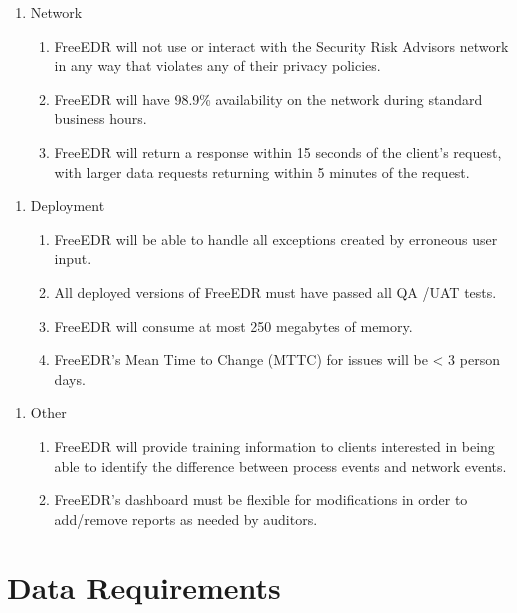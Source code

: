\documentclass{scrreprt}
\begin{document}
\begin{enumerate}[label*=N\arabic*.]
    \item Network
    \begin{enumerate}[label*=\arabic*.]
\item FreeEDR will not use or interact with the Security Risk Advisors network in any way that violates any of their privacy policies. 
\item FreeEDR will have 98.9\% availability on the network during standard business hours.
\item FreeEDR will return a response within 15 seconds of the client’s request, with larger data requests returning within 5 minutes of the request.

    \end{enumerate}
\end{enumerate}

\begin{enumerate}[label*=N\arabic*.]
    \item Deployment
    \begin{enumerate}[label*=\arabic*.]
\item FreeEDR will be able to handle all exceptions created by erroneous user input. 
\item All deployed versions of FreeEDR must have passed all QA /UAT tests.
\item FreeEDR will consume at most 250 megabytes of memory.
\item FreeEDR’s Mean Time to Change (MTTC) for issues will be < 3 person days. 

    \end{enumerate}
\end{enumerate}

\begin{enumerate}[label*=N\arabic*.]
    \item Other
    \begin{enumerate}[label*=\arabic*.]
\item FreeEDR will provide training information to clients interested in being able to identify the difference between process events and network events.
\item FreeEDR’s dashboard must be flexible for modifications in order to add/remove reports as needed by auditors.
    \end{enumerate}
\end{enumerate}


\section{Data Requirements}
\end{document}
